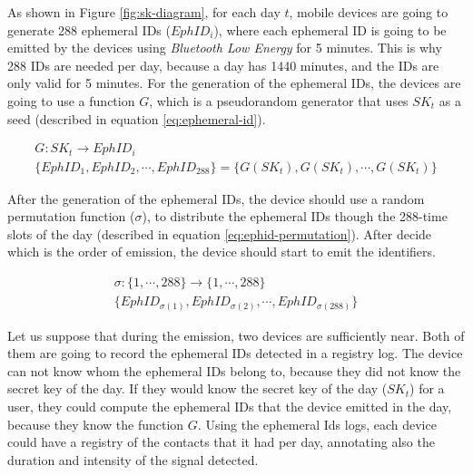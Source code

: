 \documentclass[a4paper, 12pt]{article}
\begin{document}
As shown in Figure \ref{fig:sk-diagram}, for each day $t$, mobile devices are going to generate 288 ephemeral IDs ($EphID_i$), where each ephemeral ID is going to be emitted by the devices using \textit{Bluetooth Low Energy} for 5 minutes. This is why 288 IDs are needed per day, because a day has 1440 minutes, and the IDs are only valid for 5 minutes. For the generation of the ephemeral IDs, the devices are going to use a function $G$, which is a pseudorandom generator that uses $SK_t$ as a seed (described in equation \ref{eq:ephemeral-id}).

\begin{equation}
\begin{split}
    G: SK_t \rightarrow EphID_i \\
    \{EphID_1, EphID_2, \cdots, EphID_{288}\} = \{G(SK_t), G(SK_t), \cdots, G(SK_t)\}
\end{split}
\label{eq:ephemeral-id}
\end{equation}

After the generation of the ephemeral IDs, the device should use a random permutation function ($\sigma$), to distribute the ephemeral IDs though the 288-time slots of the day (described in equation \ref{eq:ephid-permutation}). After decide which is the order of emission, the device should start to emit the identifiers.

\begin{equation}
    \begin{split}
        \sigma : \{1, \cdots, 288\} \rightarrow \{1, \cdots, 288\} \\
        \{EphID_{\sigma(1)}, EphID_{\sigma(2)}, \cdots, EphID_{\sigma(288)}\}
    \end{split}
    \label{eq:ephid-permutation}
\end{equation}

Let us suppose that during the emission, two devices are sufficiently near. Both of them are going to record the ephemeral IDs detected in a registry log. The device can not know whom the ephemeral IDs belong to, because they did not know the secret key of the day. If they would know the secret key of the day ($SK_t$) for a user, they could compute the ephemeral IDs that the device emitted in the day, because they know the function $G$. Using the ephemeral Ids logs, each device could have a registry of the contacts that it had per day, annotating also the duration and intensity of the signal detected. \\
\end{document}

